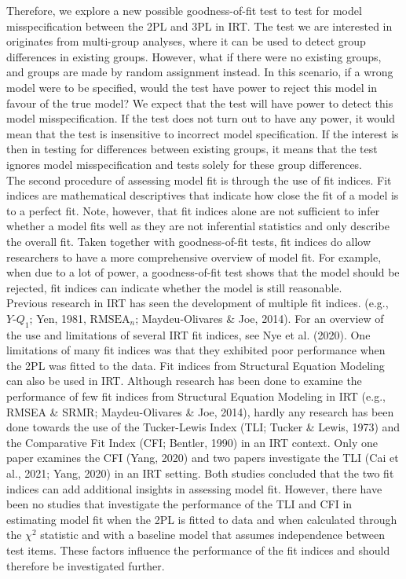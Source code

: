\documentclass[Royal,sageapa,times,doublespace]{sagej}
\begin{document}
\indent Therefore, we explore a new possible goodness-of-fit test to test for model misspecification between the 2PL and 3PL in IRT. The test we are interested in originates from multi-group analyses, where it can be used to detect group differences in existing groups. However, what if there were no existing groups, and groups are made by random assignment instead. In this scenario, if a wrong model were to be specified, would the test have power to reject this model in favour of the true model? We expect that the test will have power to detect this model misspecification. If the test does not turn out to have any power, it would mean that the test is insensitive to incorrect model specification. If the interest is then in testing for differences between existing groups, it means that the test ignores model misspecification and tests solely for these group differences. \\
\indent The second procedure of assessing model fit is through the use of fit indices. Fit indices are mathematical descriptives that indicate how close the fit of a model is to a perfect fit. Note, however, that fit indices alone are not sufficient to infer whether a model fits well as they are not inferential statistics and only describe the overall fit. Taken together with goodness-of-fit tests, fit indices do allow researchers to have a more comprehensive overview of model fit. For example, when due to a lot of power, a goodness-of-fit test shows that the model should be rejected, fit indices can indicate whether the model is still reasonable. \\ 
\indent Previous research in IRT has seen the development of multiple fit indices. (e.g., $Y\text{-}Q_1$; Yen, 1981, $\text{RMSEA}_n$; Maydeu-Olivares \& Joe, 2014). For an overview of the use and limitations of several IRT fit indices, see Nye et al. (2020). One limitations of many fit indices was that they exhibited poor performance when the 2PL was fitted to the data. Fit indices from Structural Equation Modeling can also be used in IRT. Although research has been done to examine the performance of few fit indices from Structural Equation Modeling in IRT (e.g., RMSEA \& SRMR; Maydeu-Olivares \& Joe, 2014), hardly any research has been done towards the use of the Tucker-Lewis Index (TLI; Tucker \& Lewis, 1973) and the Comparative Fit Index (CFI; Bentler, 1990) in an IRT context. Only one paper examines the CFI (Yang, 2020) and two papers investigate the TLI (Cai et al., 2021; Yang, 2020) in an IRT setting. Both studies concluded that the two fit indices can add additional insights in assessing model fit. However, there have been no studies that investigate the performance of the TLI and CFI in estimating model fit when the 2PL is fitted to data and when calculated through the $\chi^2$ statistic and with a baseline model that assumes independence between test items. These factors influence the performance of the fit indices and should therefore be investigated further. \\
\end{document}
